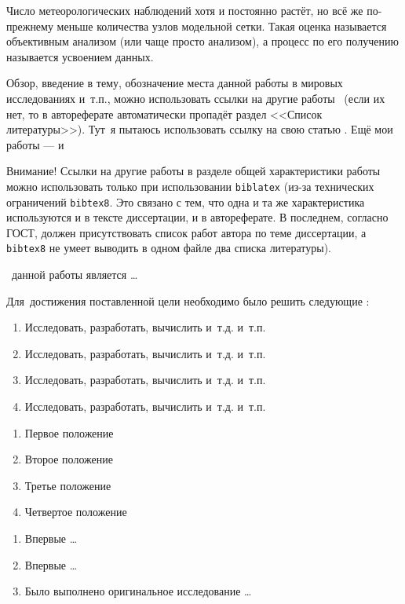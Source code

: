 Число метеорологических наблюдений хотя и постоянно растёт, но всё же по-прежнему меньше количества узлов модельной сетки. Такая оценка называется объективным анализом (или чаще просто анализом), а процесс по его получению называется усвоением данных.

\newpage
Обзор, введение в тему, обозначение места данной работы в
мировых исследованиях и~т.\:п., можно использовать ссылки на другие
работы~ (если их нет, то в автореферате
автоматически пропадёт раздел <<Список литературы>>).
Тут~я пытаюсь использовать ссылку на свою статью \cite{Mizyak-2013}. Ещё мои работы --- \cite{Slyaeva-2013} и \cite{Tolstykh-2015} 

Внимание! Ссылки
на другие работы в разделе общей характеристики работы можно
использовать только при использовании \verb!biblatex! (из-за технических
ограничений \verb!bibtex8!. Это связано с тем, что одна и та же
характеристика используются и в тексте диссертации, и в
автореферате. В последнем, согласно ГОСТ, должен присутствовать список
работ автора по теме диссертации, а \verb!bibtex8! не умеет выводить в одном
файле два списка литературы).

 \aim\ данной работы является \ldots

Для~достижения поставленной цели необходимо было решить следующие {\tasks}:
\begin{enumerate}
  \item Исследовать, разработать, вычислить и~т.\:д. и~т.\:п.
  \item Исследовать, разработать, вычислить и~т.\:д. и~т.\:п.
  \item Исследовать, разработать, вычислить и~т.\:д. и~т.\:п.
  \item Исследовать, разработать, вычислить и~т.\:д. и~т.\:п.
\end{enumerate}

\begin{enumerate}
  \item Первое положение
  \item Второе положение
  \item Третье положение
  \item Четвертое положение
\end{enumerate}

\novelty
\begin{enumerate}
  \item Впервые \ldots
  \item Впервые \ldots
  \item Было выполнено оригинальное исследование \ldots
\end{enumerate}

